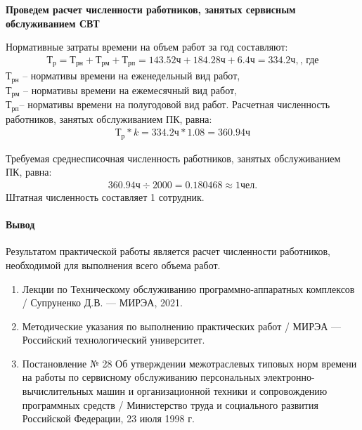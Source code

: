 \documentclass[a4paper,14pt]{extarticle}
\begin{document}
\textbf{Проведем расчет численности работников, занятых сервисным обслуживанием СВТ}

Нормативные затраты времени на объем работ за год составляют: 
\begin{align*}
	Т_р=Т_{рн}+Т_{рм}+Т_{рп} = 143.52 ч+	184.28 ч+	6.4 ч = 334.2 ч, \text{, где}
\end{align*} 
$Т_{рн}$ – нормативы времени на еженедельный вид работ,\\ $Т_{рм}$ – нормативы времени на ежемесячный вид работ,\\ $Т_{рп} $– нормативы времени на полугодовой вид работ.
Расчетная численность работников, занятых обслуживанием ПК, равна: 
\begin{align*}
		Т_р * k = 334.2ч* 1.08 = 360.94 ч
\end{align*}

Требуемая среднесписочная численность работников, занятых обслуживанием ПК, равна: 
\begin{align*}
	360.94 ч \div 2000  = 0.180468\approx 1 чел.
\end{align*}
Штатная численность составляет 1 сотрудник.


\paragraph*{Вывод}
Результатом практической работы является расчет численности работников, необходимой для выполнения всего объема работ.
\newpage
{}
\begin{enumerate}
	\item Лекции по Техническому обслуживанию программно-аппаратных комплексов / Супруненко Д.В. --- МИРЭА, 2021.
	\item Методические указания по выполнению практических работ / МИРЭА --- Российский технологический университет.
	\item Постановление № 28 Об утверждении межотраслевых типовых норм времени на работы по сервисному обслуживанию персональных электронно-вычислительных машин и организационной техники и сопровождению программных средств / Министерство труда и социального развития Российской Федерации, 23 июля 1998 г.
\end{enumerate}




\normalsize
\end{document}
